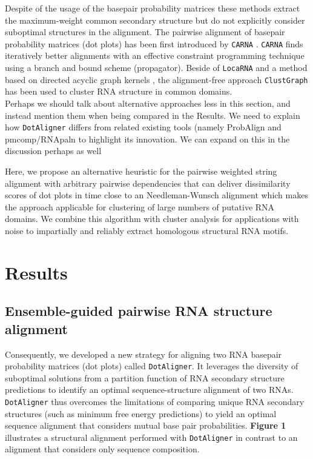 \documentclass[a4paper,11pt]{article}
\newcommand\dotaligner{\texttt{DotAligner}}
\newcommand\clustgraph{\texttt{ClustGraph}}
\newcommand\locarna{\texttt{LocaRNA}}
\newcommand\carna{\texttt{CARNA}}
\begin{document}
Despite of the usage of the basepair probability
matrices these methods extract the maximum-weight common secondary structure but
do not explicitly consider suboptimal structures in the alignment. The pairwise
alignment of basepair probability matrices (dot plots) has been first introduced
by \carna{} \cite{Palu2010,Sorescu2012}. \carna{} finds iteratively better
alignments with an effective constraint programming technique using a branch and
bound scheme (propagator). Beside of \locarna{} and a method based on directed 
acyclic graph kernels \cite{Sato18647390}, the alignment-free approach \clustgraph{}
\cite{Heyne22689765} has been used to cluster RNA structure in common domains.\\

{\color{red} Perhaps we should talk about alternative approaches less in this section, 
and instead mention them when being compared in the Results. We need to explain
how \dotaligner{} differs from related existing tools (namely ProbAlign and pmcomp/RNApaln
to highlight its innovation. We can expand on this in the discussion perhaps as well}

Here, we propose an alternative heuristic for the pairwise weighted string
alignment with arbitrary pairwise dependencies that can deliver dissimilarity
scores of dot plots in time close to an Needleman-Wunsch alignment which makes
the approach applicable for clustering of large numbers of putative RNA domains.
We combine this algorithm with cluster analysis for applications with 
noise to impartially and reliably extract homologous structural RNA motifs. \\ 

\section*{ Results }
\subsection*{ Ensemble-guided pairwise RNA structure alignment} 
 
Consequently, we developed a new strategy for aligning two RNA 
basepair probability matrices (dot plots) called \dotaligner{}. It leverages the diversity of 
suboptimal solutions from a partition function of RNA secondary structure 
predictions to identify an optimal sequence-structure alignment of two RNAs. 
\dotaligner{} thus overcomes the limitations of comparing unique RNA 
secondary structures (such as minimum free energy predictions) to yield 
an optimal sequence alignment that considers mutual base pair probabilities.
\textbf{Figure 1} illustrates a structural alignment performed with \dotaligner{}
in contrast to an alignment that considers only sequence composition.\\
\end{document}
